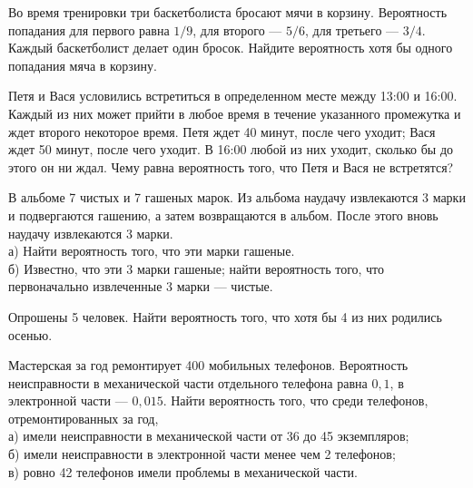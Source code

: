 \newpage\setcounter{zad}{0}



\begin{zkrW}{20}\noindent 
	Во время тренировки три баскетболиста бросают мячи в корзину. Вероятность попадания для первого равна $1/9$, для второго --- $5/6$, для третьего --- $3/4$. Каждый баскетболист делает один бросок. Найдите вероятность хотя бы одного попадания мяча в корзину.
 
\end{zkrW}

\begin{zkrW}{20}\noindent 
	Петя и Вася условились встретиться в определенном месте между 13:00 и 16:00. Каждый из них может прийти в любое время в течение указанного промежутка и ждет второго некоторое время. Петя ждет 40 минут, после чего уходит; Вася ждет 50 минут, после чего уходит. В 16:00 любой из них уходит, сколько бы до этого он ни ждал. Чему равна вероятность того, что Петя и Вася не встретятся?
 
\end{zkrW}

\begin{zkrW}{20}\noindent 
	В альбоме 7 чистых и 7 гашеных марок. Из альбома наудачу извлекаются 3 марки и подвергаются гашению, а затем возвращаются в альбом. После этого вновь наудачу извлекаются 3 марки. \\ \indent а) Найти вероятность того, что эти марки гашеные. \\ \indent б) Известно, что эти 3 марки гашеные; найти вероятность того, что первоначально извлеченные 3 марки --- чистые.
 
\end{zkrW}

\begin{zkrW}{20}\noindent 
	Опрошены 5 человек. Найти вероятность того, что хотя бы 4 из них родились осенью.
 
\end{zkrW}

\begin{zkrW}{20}\noindent 
	Мастерская за год ремонтирует 400 мобильных телефонов. Вероятность неисправности в механической части отдельного телефона равна $0{,}1$, в электронной части --- $0{,}015$. Найти вероятность того, что среди телефонов, отремонтированных за год, \\ \indent а) имели неисправности в механической части от 36 до 45 экземпляров; \\ \indent б) имели неисправности в электронной части менее чем 2 телефонов; \\ \indent в) ровно 42 телефонов имели проблемы в механической части.
 
\end{zkrW}

